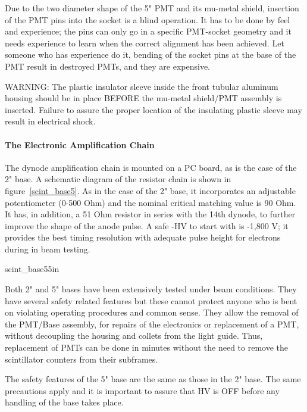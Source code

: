 Due to the two diameter shape of the 5" PMT and its mu-metal shield, insertion  
of the PMT pins into the socket is a blind operation. It has to be done by feel 
and experience; the pins can only go in a specific PMT-socket geometry and it 
needs experience to learn when the correct alignment has been achieved. Let 
someone who has experience do it, bending of the socket pins at the base of the 
PMT result in destroyed PMTs, and they are expensive.

WARNING: The plastic insulator sleeve inside the front tubular aluminum 
housing should be in place BEFORE the mu-metal shield/PMT assembly is inserted. 
Failure to assure the proper location of the insulating plastic sleeve may 
result in electrical shock.
 
\paragraph{The Electronic Amplification Chain}


The dynode amplification chain is mounted on a PC board, as is the case of the 
2" base. A schematic diagram of the resistor chain is shown in 
figure~\ref{scint_base5}. As in 
the case of the 2" base, it incorporates an adjustable potentiometer (0-500 
Ohm) and the nominal critical matching value is 90 Ohm. It has, in addition, a 
51 Ohm resistor in series with the 14th dynode, to further improve the shape of 
the anode pulse. A safe -HV to start with is -1,800 V; it provides the best 
timing resolution with adequate pulse height for electrons during in beam 
testing.

{scint_base5}{5in}


   Both 2" and 5" bases have been extensively tested under beam conditions. 
They have several safety related features but these cannot protect anyone who 
is bent on violating operating procedures and common sense. They allow the 
removal of the PMT/Base assembly, for repairs of the electronics or replacement 
of a PMT, without decoupling the housing and collets from the light guide. 
Thus, replacement of PMTs can be done in minutes without the need to remove the 
scintillator counters from their subframes.

   The safety features of the 5" base are the same as those in the 2" base. The
same precautions apply and it is important to assure that HV is OFF before any
handling of the base takes place. 


